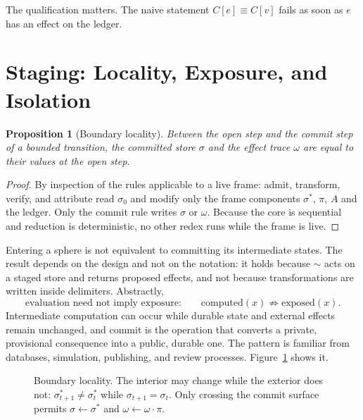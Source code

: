 \documentclass[11pt]{article}
\newtheorem{proposition}{Proposition}
\begin{document}
The qualification matters. The naive statement $C[e]\equiv C[v]$ fails as soon as $e$ has an effect on the ledger.

\section{Staging: Locality, Exposure, and Isolation}

\begin{proposition}[Boundary locality]\label{p:loc}
Between the open step and the commit step of a bounded transition, the committed store $\sigma$ and the effect trace $\omega$ are equal to their values at the open step.
\end{proposition}
\begin{proof}
By inspection of the rules applicable to a live frame: admit, transform, verify, and attribute read $\sigma_0$ and modify only the frame components $\sigma^{\ast}$, $\pi$, $A$ and the ledger. Only the commit rule writes $\sigma$ or $\omega$. Because the core is sequential and reduction is deterministic, no other redex runs while the frame is live.
\end{proof}

Entering a sphere is not equivalent to committing its intermediate states. The result depends on the design and not on the notation: it holds because $\sim$ acts on a staged store and returns proposed effects, and not because transformations are written inside delimiters. Abstractly,
\[
\text{evaluation need not imply exposure:}\qquad \mathrm{computed}(x)\not\Rightarrow\mathrm{exposed}(x).
\]
Intermediate computation can occur while durable state and external effects remain unchanged, and commit is the operation that converts a private, provisional consequence into a public, durable one. The pattern is familiar from databases, simulation, publishing, and review processes. Figure~\ref{f:annulus} shows it.

\begin{figure}[h]
\centering
{}
\caption{Boundary locality. The interior may change while the exterior does not: $\sigma^{\ast}_{t+1}\neq\sigma^{\ast}_t$ while $\sigma_{t+1}=\sigma_t$. Only crossing the commit surface permits $\sigma\leftarrow\sigma^{\ast}$ and $\omega\leftarrow\omega\cdot\pi$.}
\label{f:annulus}
\end{figure}
\end{document}
